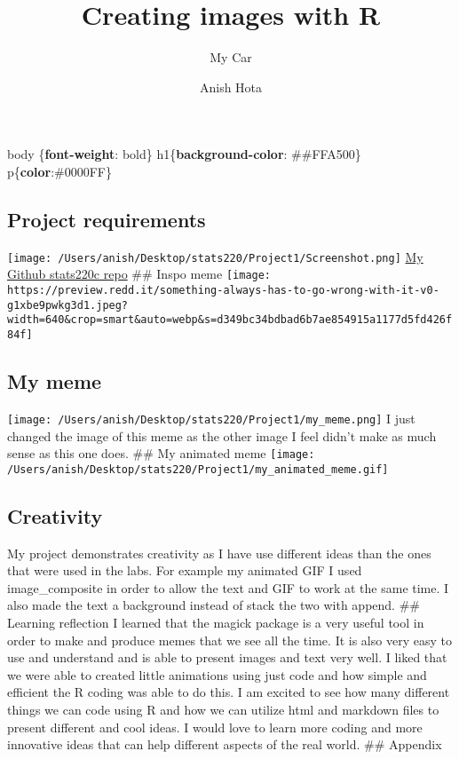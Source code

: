 \documentclass[
]{article}
\title{Creating images with R}
\subtitle{My Car}
\author{Anish Hota}
\date{}
\newenvironment{Shaded}{\begin{snugshade}}{\end{snugshade}}
\newcommand{\CharTok}[1]{\textcolor[rgb]{0.31,0.60,0.02}{#1}}
\newcommand{\ConstantTok}[1]{\textcolor[rgb]{0.56,0.35,0.01}{#1}}
\newcommand{\DecValTok}[1]{\textcolor[rgb]{0.00,0.00,0.81}{#1}}
\newcommand{\KeywordTok}[1]{\textcolor[rgb]{0.13,0.29,0.53}{\textbf{#1}}}
\newcommand{\NormalTok}[1]{#1}
\begin{document}
\maketitle

\begin{Shaded}
\begin{Highlighting}[]
\NormalTok{body \{}\KeywordTok{font{-}weight}\CharTok{:} \DecValTok{bold}\NormalTok{\}}
\NormalTok{h1\{}\KeywordTok{background{-}color}\CharTok{:}\NormalTok{ \#}\ConstantTok{\#FFA500}\NormalTok{\}}
\NormalTok{p\{}\KeywordTok{color}\CharTok{:}\ConstantTok{\#0000FF}\NormalTok{\}}
\end{Highlighting}
\end{Shaded}

\subsection{Project requirements}\label{project-requirements}

\texttt{[image: /Users/anish/Desktop/stats220/Project1/Screenshot.png]}
\href{https://github.com/ahot228/stats220}{My Github stats220c repo}
\#\# Inspo meme
\texttt{[image: https://preview.redd.it/something-always-has-to-go-wrong-with-it-v0-g1xbe9pwkg3d1.jpeg?width=640\&crop=smart\&auto=webp\&s=d349bc34bdbad6b7ae854915a1177d5fd426f84f]}

\subsection{My meme}\label{my-meme}

\texttt{[image: /Users/anish/Desktop/stats220/Project1/my\_meme.png]} I
just changed the image of this meme as the other image I feel didn't
make as much sense as this one does. \#\# My animated meme
\texttt{[image: /Users/anish/Desktop/stats220/Project1/my\_animated\_meme.gif]}

\subsection{Creativity}\label{creativity}

My project demonstrates creativity as I have use different ideas than
the ones that were used in the labs. For example my animated GIF I used
image\_composite in order to allow the text and GIF to work at the same
time. I also made the text a background instead of stack the two with
append. \#\# Learning reflection I learned that the magick package is a
very useful tool in order to make and produce memes that we see all the
time. It is also very easy to use and understand and is able to present
images and text very well. I liked that we were able to created little
animations using just code and how simple and efficient the R coding was
able to do this. I am excited to see how many different things we can
code using R and how we can utilize html and markdown files to present
different and cool ideas. I would love to learn more coding and more
innovative ideas that can help different aspects of the real world. \#\#
Appendix
\end{document}
